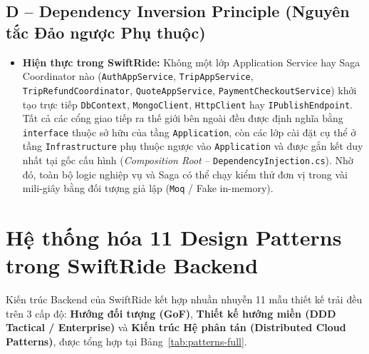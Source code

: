 \documentclass[12pt,a4paper]{article}
\begin{document}
\subsection{D -- Dependency Inversion Principle (Nguyên tắc Đảo ngược Phụ thuộc)}
\begin{itemize}[nosep]
    \item \textbf{Hiện thực trong SwiftRide:} Không một lớp Application Service hay Saga Coordinator nào (\texttt{AuthAppService}, \texttt{TripAppService}, \texttt{TripRefundCoordinator}, \texttt{QuoteAppService}, \texttt{PaymentCheckoutService}) khởi tạo trực tiếp \texttt{DbContext}, \texttt{MongoClient}, \texttt{HttpClient} hay \texttt{IPublishEndpoint}. Tất cả các cổng giao tiếp ra thế giới bên ngoài đều được định nghĩa bằng \texttt{interface} thuộc sở hữu của tầng \texttt{Application}, còn các lớp cài đặt cụ thể ở tầng \texttt{Infrastructure} phụ thuộc ngược vào \texttt{Application} và được gắn kết duy nhất tại gốc cấu hình (\textit{Composition Root} -- \texttt{DependencyInjection.cs}). Nhờ đó, toàn bộ logic nghiệp vụ và Saga có thể chạy kiểm thử đơn vị trong vài mili-giây bằng đối tượng giả lập (\texttt{Moq} / Fake in-memory).
\end{itemize}

\section{Hệ thống hóa 11 Design Patterns trong SwiftRide Backend}

Kiến trúc Backend của SwiftRide kết hợp nhuần nhuyễn 11 mẫu thiết kế trải đều trên 3 cấp độ: \textbf{Hướng đối tượng (GoF)}, \textbf{Thiết kế hướng miền (DDD Tactical / Enterprise)} và \textbf{Kiến trúc Hệ phân tán (Distributed Cloud Patterns)}, được tổng hợp tại Bảng~\ref{tab:patterns-full}.
\end{document}
